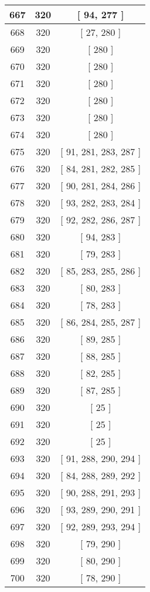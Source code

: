\begin{center}
\begin{longtable}[H]{|| c c c ||}
\hline
667 & 320 & [ 94, 277 ] \\ 
\hline
668 & 320 & [ 27, 280 ] \\ 
\hline
669 & 320 & [ 280 ] \\ 
\hline
670 & 320 & [ 280 ] \\ 
\hline
671 & 320 & [ 280 ] \\ 
\hline
672 & 320 & [ 280 ] \\ 
\hline
673 & 320 & [ 280 ] \\ 
\hline
674 & 320 & [ 280 ] \\ 
\hline
675 & 320 & [ 91, 281, 283, 287 ] \\ 
\hline
676 & 320 & [ 84, 281, 282, 285 ] \\ 
\hline
677 & 320 & [ 90, 281, 284, 286 ] \\ 
\hline
678 & 320 & [ 93, 282, 283, 284 ] \\ 
\hline
679 & 320 & [ 92, 282, 286, 287 ] \\ 
\hline
680 & 320 & [ 94, 283 ] \\ 
\hline
681 & 320 & [ 79, 283 ] \\ 
\hline
682 & 320 & [ 85, 283, 285, 286 ] \\ 
\hline
683 & 320 & [ 80, 283 ] \\ 
\hline
684 & 320 & [ 78, 283 ] \\ 
\hline
685 & 320 & [ 86, 284, 285, 287 ] \\ 
\hline
686 & 320 & [ 89, 285 ] \\ 
\hline
687 & 320 & [ 88, 285 ] \\ 
\hline
688 & 320 & [ 82, 285 ] \\ 
\hline
689 & 320 & [ 87, 285 ] \\ 
\hline
690 & 320 & [ 25 ] \\ 
\hline
691 & 320 & [ 25 ] \\ 
\hline
692 & 320 & [ 25 ] \\ 
\hline
693 & 320 & [ 91, 288, 290, 294 ] \\ 
\hline
694 & 320 & [ 84, 288, 289, 292 ] \\ 
\hline
695 & 320 & [ 90, 288, 291, 293 ] \\ 
\hline
696 & 320 & [ 93, 289, 290, 291 ] \\ 
\hline
697 & 320 & [ 92, 289, 293, 294 ] \\ 
\hline
698 & 320 & [ 79, 290 ] \\ 
\hline
699 & 320 & [ 80, 290 ] \\ 
\hline
700 & 320 & [ 78, 290 ] \\ 

\end{longtable}
\end{center}
